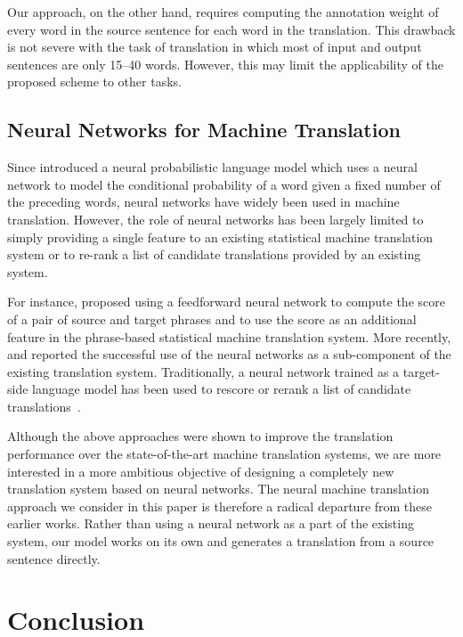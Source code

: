 Our approach, on the other hand, requires computing the annotation weight of
every word in the source sentence for each word in the translation. This
drawback is not severe with the task of translation in which most of input and
output sentences are only 15--40 words. However, this may limit the
applicability of the proposed scheme to other tasks.


\subsection{Neural Networks for Machine Translation}

Since \citet{Bengio2003lm} introduced a neural probabilistic language model
which uses a neural network to model the conditional probability of a word given
a fixed number of the preceding words, neural networks have widely been used in
machine translation. However, the role of neural networks has been largely
limited to simply providing a single feature to an existing statistical machine
translation system or to re-rank a list of candidate translations provided by an
existing system. 

For instance, \citet{Schwenk2012} proposed using a feedforward neural network to
compute the score of a pair of source and target phrases and to use the score as
an additional feature in the phrase-based statistical machine translation
system. More recently, \citet{Kalchbrenner2013} and \citet{Devlin2014} reported
the successful use of the neural networks as a sub-component of the existing
translation system. Traditionally, a neural network trained as a target-side
language model has been used to rescore or rerank a list of candidate
translations~\citep[see, e.g.,][]{Schwenk2006t}.

Although the above approaches were shown to improve the translation performance
over the state-of-the-art machine translation systems, we are more interested in
a more ambitious objective of designing a completely new translation system
based on neural networks. The neural machine translation approach we consider in
this paper is therefore a radical departure from these earlier works. Rather
than using a neural network as a part of the existing system, our model works on
its own and generates a translation from a source sentence directly.


\section{Conclusion}

